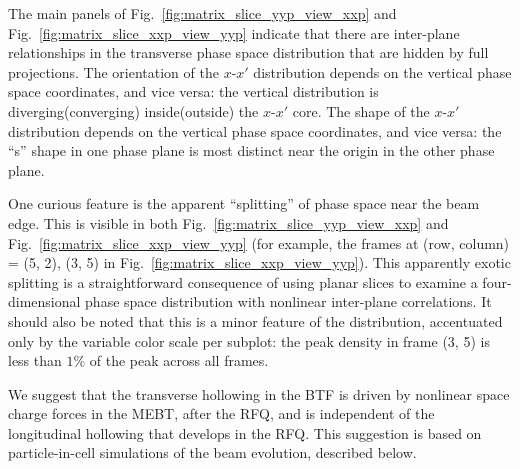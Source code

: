 \documentclass[%
 reprint,
nofootinbib,
 amsmath,amssymb,
 aps,
prstab,
]{revtex4-2}
\begin{document}
The main panels of Fig.~\ref{fig:matrix_slice_yyp_view_xxp} and Fig.~\ref{fig:matrix_slice_xxp_view_yyp} indicate that there are inter-plane relationships in the transverse phase space distribution that are hidden by full projections. The orientation of the $x$-$x'$ distribution depends on the vertical phase space coordinates, and vice versa: the vertical distribution is diverging(converging) inside(outside) the $x$-$x'$ core. The shape of the $x$-$x'$ distribution depends on the vertical phase space coordinates, and vice versa: the ``s'' shape in one phase plane is most distinct near the origin in the other phase plane. 

One curious feature is the apparent ``splitting'' of phase space near the beam edge. This is visible in both Fig.~\ref{fig:matrix_slice_yyp_view_xxp} and Fig.~\ref{fig:matrix_slice_xxp_view_yyp} (for example, the frames at (row, column) = (5, 2), (3, 5) in Fig.~\ref{fig:matrix_slice_xxp_view_yyp}). This apparently exotic splitting is a straightforward consequence of using planar slices to examine a four-dimensional phase space distribution with nonlinear inter-plane correlations. It should also be noted that this is a minor feature of the distribution, accentuated only by the variable color scale per subplot: the peak density in frame (3, 5) is less than $1\%$ of the peak across all frames.

We suggest that the transverse hollowing in the BTF is driven by nonlinear space charge forces in the MEBT, after the RFQ, and is independent of the longitudinal hollowing that develops in the RFQ. This suggestion is based on particle-in-cell simulations of the beam evolution, described below.
\end{document}
